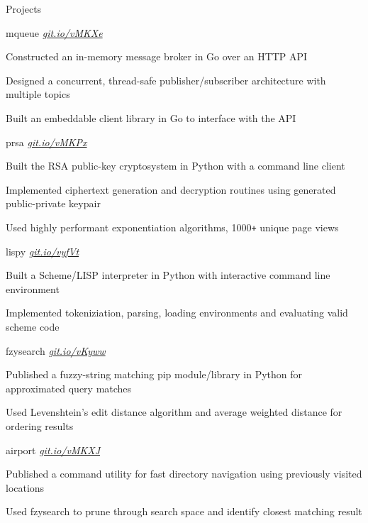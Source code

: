 \documentclass{resume} %
\begin{document}
\begin{rSection}{Projects}
  \begin{rSubsection}{mqueue}
	  {\em {\href{http://github.com/ridwanmsharif/mqueue}
		    {git.io/vMKXe}}}
	  {}

	  \item Constructed an in-memory message broker in Go
			  over an HTTP API
	  \item Designed a concurrent, thread-safe publisher/subscriber
		  architecture with multiple topics
      \item Built an embeddable client library in Go to interface with the API
        
  \end{rSubsection}

  \begin{rSubsection}{prsa}
	  {\em {\href{http://github.com/ridwanmsharif/prsa}
		    {git.io/vMKPx}}}
	  {}

	  \item Built the RSA public-key cryptosystem in Python with a
			  command line client
	  \item Implemented ciphertext generation and decryption routines using
		  generated public-private keypair
	  \item Used highly performant exponentiation algorithms,
		  1000\texttt{+} unique page views
  \end{rSubsection}

  \begin{rSubsection}{lispy}
	  {\em {\href{http://github.com/ridwanmsharif/lispy}
		    {git.io/vyfVt}}}
	  {}

	  \item Built a Scheme/LISP interpreter in Python with interactive command line environment
	  \item Implemented tokeniziation, parsing, loading environments
        and evaluating valid scheme code
  \end{rSubsection}

  \begin{rSubsection}{fzysearch}
	  {\em{ \href{http://github.com/ridwanmsharif/fzysearch}
		    {git.io/vKyww}}}
	  {}

	 \item Published a fuzzy-string matching pip module/library in
		 Python for approximated query matches
	\item Used Levenshtein's edit distance algorithm and average
		weighted distance for ordering results
  \end{rSubsection}
  
  \begin{rSubsection}{airport}
	  {\em{ \href{http://github.com/ridwanmsharif/airport}
		    {git.io/vMKXJ}}}
	  {}

	\item Published a command utility for fast directory navigation using
		previously visited locations
	\item Used fzysearch to prune through search space and identify closest
		matching result
  \end{rSubsection}
\end{rSection}
\end{document}
